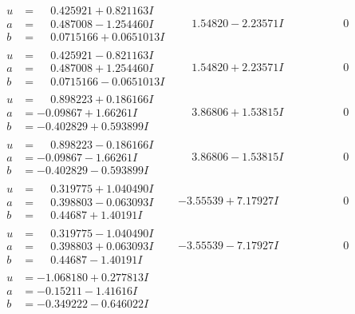 \documentclass[1p]{elsarticle_modified}
\theoremstyle{definition}
\begin{document}
$$\begin{array}{c|c|c}
\begin{aligned}
u &= \phantom{-}0.425921 + 0.821163 I \\
a &= \phantom{-}0.487008 - 1.254460 I \\
b &= \phantom{-}0.0715166 + 0.0651013 I\end{aligned}
 & \phantom{-}1.54820 - 2.23571 I & \phantom{-0.000000 } 0 \\ \hline\begin{aligned}
u &= \phantom{-}0.425921 - 0.821163 I \\
a &= \phantom{-}0.487008 + 1.254460 I \\
b &= \phantom{-}0.0715166 - 0.0651013 I\end{aligned}
 & \phantom{-}1.54820 + 2.23571 I & \phantom{-0.000000 } 0 \\ \hline\begin{aligned}
u &= \phantom{-}0.898223 + 0.186166 I \\
a &= -0.09867 + 1.66261 I \\
b &= -0.402829 + 0.593899 I\end{aligned}
 & \phantom{-}3.86806 + 1.53815 I & \phantom{-0.000000 } 0 \\ \hline\begin{aligned}
u &= \phantom{-}0.898223 - 0.186166 I \\
a &= -0.09867 - 1.66261 I \\
b &= -0.402829 - 0.593899 I\end{aligned}
 & \phantom{-}3.86806 - 1.53815 I & \phantom{-0.000000 } 0 \\ \hline\begin{aligned}
u &= \phantom{-}0.319775 + 1.040490 I \\
a &= \phantom{-}0.398803 - 0.063093 I \\
b &= \phantom{-}0.44687 + 1.40191 I\end{aligned}
 & -3.55539 + 7.17927 I & \phantom{-0.000000 } 0 \\ \hline\begin{aligned}
u &= \phantom{-}0.319775 - 1.040490 I \\
a &= \phantom{-}0.398803 + 0.063093 I \\
b &= \phantom{-}0.44687 - 1.40191 I\end{aligned}
 & -3.55539 - 7.17927 I & \phantom{-0.000000 } 0 \\ \hline\begin{aligned}
u &= -1.068180 + 0.277813 I \\
a &= -0.15211 - 1.41616 I \\
b &= -0.349222 - 0.646022 I\end{aligned}

\end{array}$$
\end{document}
